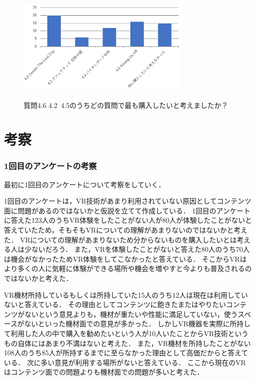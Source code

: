\documentclass[12pt,a4j]{ltjsarticle}
\begin{document}
\begin{figure}[h]
\begin{center}
 \includegraphics[clip,width=85mm,height=55mm]{
 アンケート2_4_6.pdf}
\end{center}
 \caption{質問4.6 4.2~4.5のうちどの質問で最も購入したいと考えましたか？}
 \label{fig:アンケート2_4_6.pdf}
\end{figure}


\clearpage

\section{考察}
\subsubsection{1回目のアンケートの考察}
最初に1回目のアンケートについて考察をしていく．

1回目のアンケートは，VR技術があまり利用されていない原因としてコンテンツ面に問題があるのではないかと仮説を立てて作成している．
1回目のアンケートに答えた123人のうちVR体験をしたことがない人が80人が体験したことがないと答えていたため，そもそもVRについての理解があまりないのではないかと考えた．
VRについての理解があまりないため分からないものを購入したいとは考える人は少ないだろう．
また，VRを体験したことがないと答えた80人のうち70人は機会がなかったためVR体験をしてこなかったと答えている．
そこからVRはより多くの人に気軽に体験ができる場所や機会を増やすと今よりも普及されるのではないかと考えた．

VR機材所持しているもしくは所持していた15人のうち12人は現在は利用していないと答えている．
その理由としてコンテンツに飽きたまたはやりたいコンテンツがないという意見よりも，機材が重たいや性能に満足していない，使うスペースがないといった機材面での意見が多かった．
しかしVR機器を実際に所持して利用した人の中で購入を勧めたいという人が10人いたことからVR技術というもの自体にはあまり不満はないと考えた．
また，VR機材を所持したことがない108人のうち85人が所持するまでに至らなかった理由として高価だからと答えている．
次に多い意見が利用する場所がないと答えている．
ここから現在のVRはコンテンツ面での問題よりも機材面での問題が多いと考えた．
\end{document}
